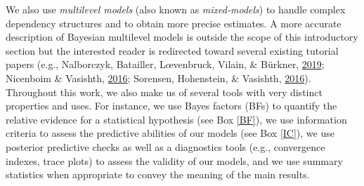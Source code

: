 \documentclass[a4paper,12pt,twoside,openright,oldfontcommands]{memoir}
\begin{document}
We also use \emph{multilevel models} (also known as \emph{mixed-models})
to handle complex dependency structures and to obtain more precise
estimates. A more accurate description of Bayesian multilevel models is
outside the scope of this introductory section but the interested reader
is redirected toward several existing tutorial papers (e.g., Nalborczyk,
Batailler, Lœvenbruck, Vilain, \& Bürkner,
\protect\hyperlink{ref-nalborczyk_introduction_2019}{2019}; Nicenboim \&
Vasishth, \protect\hyperlink{ref-nicenboim_statistical_2016}{2016};
Sorensen, Hohenstein, \& Vasishth,
\protect\hyperlink{ref-sorensen_bayesian_2016}{2016}). Throughout this
work, we also make us of several tools with very distinct properties and
uses. For instance, we use Bayes factors (BFs) to quantify the relative
evidence for a statistical hypothesis (see Box \ref{BF}), we use
information criteria to assess the predictive abilities of our models
(see Box \ref{IC}), we use posterior predictive checks as well as a
diagnostics tools (e.g., convergence indexes, trace plots) to assess the
validity of our models, and we use summary statistics when appropriate
to convey the meaning of the main results.

\vspace{2mm}
\end{document}

